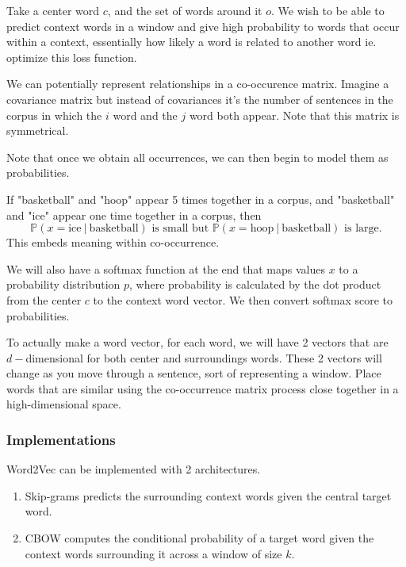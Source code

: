 \documentclass[12pt]{scrartcl}
\begin{document}
Take a center word $c$, and the set of words around it $o$. We wish to be able to predict context words in a window and give high probability to words that occur within a context, essentially how likely a word is related to another word ie. optimize this loss function.
    
\begin{example}
    We can potentially represent relationships in a co-occurence matrix. Imagine a covariance matrix but instead of covariances it's the number of sentences in the corpus in which the $i$ word and the $j$ word both appear. Note that this matrix is symmetrical.
\end{example}

Note that once we obtain all occurrences, we can then begin to model them as probabilities.

\begin{example}
    If "basketball" and "hoop" appear 5 times together in a corpus, and "basketball" and "ice" appear one time together in a corpus, then 
    \[\mathbb{P}(x = \text{ice} \ | \ \text{basketball}) \text{ is small but } \mathbb{P}(x = \text{hoop} \ | \ \text{basketball}) \text{ is large.}\]
    This embeds meaning within co-occurrence. 
\end{example}

We will also have a softmax function at the end that maps values $x$ to a probability distribution $p$, where probability is calculated by the dot product from the center $c$ to the context word vector. We then convert softmax score to probabilities.

To actually make a word vector, for each word, we will have 2 vectors that are $d-$dimensional for both center and surroundings words. These 2 vectors will change as you move through a sentence, sort of representing a window. Place words that are similar using the co-occurrence matrix process close together in a high-dimensional space.

\subsubsection{Implementations}

Word2Vec can be implemented with 2 architectures.
\begin{enumerate}
    \item Skip-grams predicts the surrounding context words given the central target word.
    \item CBOW computes the conditional probability of a target word given the context words surrounding it across a window of size $k$.
\end{enumerate}
\end{document}
